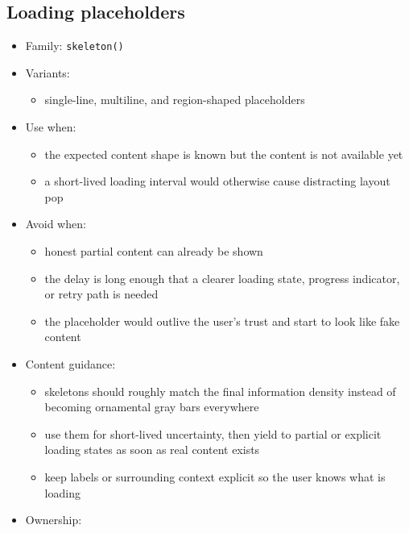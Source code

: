 \subsection{Loading placeholders}\label{record-019-loading-placeholders}

\begin{itemize}
\tightlist
\item
  Family: \texttt{s\allowbreak{}k\allowbreak{}e\allowbreak{}l\allowbreak{}e\allowbreak{}t\allowbreak{}o\allowbreak{}n\allowbreak{}(\allowbreak{})}
\item
  Variants:

  \begin{itemize}
  \tightlist
  \item
    single-line, multiline, and region-shaped placeholders
  \end{itemize}
\item
  Use when:

  \begin{itemize}
  \tightlist
  \item
    the expected content shape is known but the content is not available yet
  \item
    a short-lived loading interval would otherwise cause distracting layout pop
  \end{itemize}
\item
  Avoid when:

  \begin{itemize}
  \tightlist
  \item
    honest partial content can already be shown
  \item
    the delay is long enough that a clearer loading state, progress indicator, or retry path is needed
  \item
    the placeholder would outlive the user's trust and start to look like fake content
  \end{itemize}
\item
  Content guidance:

  \begin{itemize}
  \tightlist
  \item
    skeletons should roughly match the final information density instead of becoming ornamental gray bars everywhere
  \item
    use them for short-lived uncertainty, then yield to partial or explicit loading states as soon as real content exists
  \item
    keep labels or surrounding context explicit so the user knows what is loading
  \end{itemize}
\item
  Ownership:


\end{itemize}
